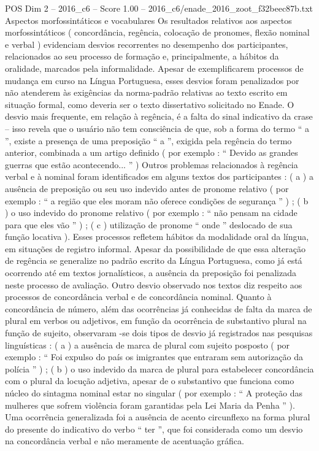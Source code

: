 \begin{textsample}{POS Dim 2 – 2016\_c6 – Score 1.00 – 2016\_c6/enade\_2016\_zoot\_f32beec87b.txt}
Aspectos morfossintáticos e vocabulares Os resultados relativos aos aspectos morfossintáticos ( concordância, regência, colocação de pronomes, flexão nominal e verbal ) evidenciam desvios recorrentes no desempenho dos participantes, relacionados ao seu processo de formação e, principalmente, a hábitos da oralidade, marcados pela informalidade.
Apesar de exemplificarem processos de mudança em curso na Língua Portuguesa, esses desvios foram penalizados por não atenderem às exigências da norma-padrão relativas ao texto escrito em situação formal, como deveria ser o texto dissertativo solicitado no Enade.
O desvio mais frequente, em relação à regência, é a falta do sinal indicativo da crase – isso revela que o usuário não tem consciência de que, sob a forma do termo “ a ”, existe a presença de uma preposição “ a ”, exigida pela regência do termo anterior, combinada a um artigo definido ( por exemplo : “ Devido as grandes guerras que estão acontecendo... ” ) Outros problemas relacionados à regência verbal e à nominal foram identificados em alguns textos dos participantes : ( a ) a ausência de preposição ou seu uso indevido antes de pronome relativo ( por exemplo : “ a região que eles moram não oferece condições de segurança ” ) ; ( b ) o uso indevido do pronome relativo ( por exemplo : “ não pensam na cidade para que eles vão ” ) ; ( c ) utilização de pronome “ onde ” deslocado de sua função locativa ).
Esses processos refletem hábitos da modalidade oral da língua, em situações de registro informal.
Apesar da possibilidade de que essa alteração de regência se generalize no padrão escrito da Língua Portuguesa, como já está ocorrendo até em textos jornalísticos, a ausência da preposição foi penalizada neste processo de avaliação.
Outro desvio observado nos textos diz respeito aos processos de concordância verbal e de concordância nominal.
Quanto à concordância de número, além das ocorrências já conhecidas de falta da marca de plural em verbos ou adjetivos, em função da ocorrência de substantivo plural na função de sujeito, observaram -se dois tipos de desvio já registrados nas pesquisas linguísticas : ( a ) a ausência de marca de plural com sujeito posposto ( por exemplo : “ Foi expulso do país os imigrantes que entraram sem autorização da polícia ” ) ; ( b ) o uso indevido da marca de plural para estabelecer concordância com o plural da locução adjetiva, apesar de o substantivo que funciona como núcleo do sintagma nominal estar no singular ( por exemplo : “ A proteção das mulheres que sofrem violência foram garantidas pela Lei Maria da Penha ” ).
Uma ocorrência generalizada foi a ausência de acento circunflexo na forma plural do presente do indicativo do verbo “ ter ”, que foi considerada como um desvio na concordância verbal e não meramente de acentuação gráfica.

\end{textsample}
